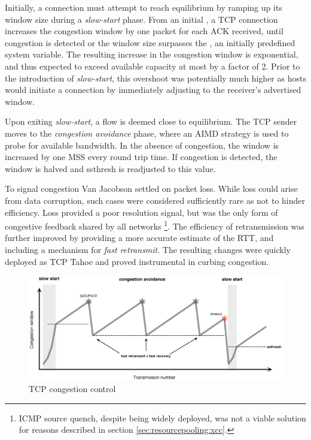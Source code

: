 Initially, a connection must attempt to reach equilibrium by ramping up its window size during a \textit{slow-start} phase. 
From an initial , a \ac{TCP} connection increases the congestion window by one packet for each \ac{ACK} received, until congestion is detected or the window size surpasses the , an initially predefined system variable.
The resulting increase in the congestion window is exponential, and thus expected to exceed available capacity at most by a factor of 2. 
Prior to the introduction of \textit{slow-start}, this overshoot was potentially much higher as hosts would initiate a connection by immediately adjusting to the receiver's advertised window. 

Upon exiting \textit{slow-start}, a flow is deemed close to equilibrium.
The \ac{TCP} sender moves to the \textit{congestion avoidance} phase, where an \ac{AIMD} strategy is used to probe for available bandwidth. 
In the absence of congestion, the window is increased by one \ac{MSS} every round trip time.
If congestion is detected, the window is halved and \ac{ssthresh} is readjusted to this value.

To signal congestion Van Jacobson settled on packet loss. 
While loss could arise from data corruption, such cases were considered sufficiently rare as not to hinder efficiency. 
Loss provided a poor resolution signal, but was the only form of congestive feedback shared by all networks 
\footnote{\ac{ICMP} source quench, despite being widely deployed, was not a viable solution for reasons described in section \ref{sec:resourcepooling:xcc}.}.
The efficiency of retransmission was further improved by providing a more accurate estimate of the \ac{RTT}, and including a mechanism for \textit{fast retransmit}. 
The resulting changes were quickly deployed as \ac{TCP} Tahoe and proved instrumental in curbing congestion. 


\begin{figure}
    \centering
    \includegraphics[width=5.0in]{figures/resourcepooling/tcpnewreno}
    \caption{\acs{TCP} congestion control}
    \label{fig:tcpcc}
\end{figure}

